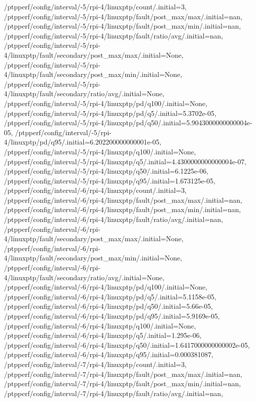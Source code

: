 {    /ptpperf/config/interval/-5/rpi-4/linuxptp/count/.initial=3,
    /ptpperf/config/interval/-5/rpi-4/linuxptp/fault/post_max/max/.initial=nan,
    /ptpperf/config/interval/-5/rpi-4/linuxptp/fault/post_max/min/.initial=nan,
    /ptpperf/config/interval/-5/rpi-4/linuxptp/fault/ratio/avg/.initial=nan,
    /ptpperf/config/interval/-5/rpi-4/linuxptp/fault/secondary/post_max/max/.initial=None,
    /ptpperf/config/interval/-5/rpi-4/linuxptp/fault/secondary/post_max/min/.initial=None,
    /ptpperf/config/interval/-5/rpi-4/linuxptp/fault/secondary/ratio/avg/.initial=None,
    /ptpperf/config/interval/-5/rpi-4/linuxptp/pd/q100/.initial=None,
    /ptpperf/config/interval/-5/rpi-4/linuxptp/pd/q5/.initial=5.3702e-05,
    /ptpperf/config/interval/-5/rpi-4/linuxptp/pd/q50/.initial=5.9043000000000004e-05,
    /ptpperf/config/interval/-5/rpi-4/linuxptp/pd/q95/.initial=6.202200000000001e-05,
    /ptpperf/config/interval/-5/rpi-4/linuxptp/q100/.initial=None,
    /ptpperf/config/interval/-5/rpi-4/linuxptp/q5/.initial=4.4300000000000004e-07,
    /ptpperf/config/interval/-5/rpi-4/linuxptp/q50/.initial=6.1225e-06,
    /ptpperf/config/interval/-5/rpi-4/linuxptp/q95/.initial=1.673125e-05,
    /ptpperf/config/interval/-6/rpi-4/linuxptp/count/.initial=3,
    /ptpperf/config/interval/-6/rpi-4/linuxptp/fault/post_max/max/.initial=nan,
    /ptpperf/config/interval/-6/rpi-4/linuxptp/fault/post_max/min/.initial=nan,
    /ptpperf/config/interval/-6/rpi-4/linuxptp/fault/ratio/avg/.initial=nan,
    /ptpperf/config/interval/-6/rpi-4/linuxptp/fault/secondary/post_max/max/.initial=None,
    /ptpperf/config/interval/-6/rpi-4/linuxptp/fault/secondary/post_max/min/.initial=None,
    /ptpperf/config/interval/-6/rpi-4/linuxptp/fault/secondary/ratio/avg/.initial=None,
    /ptpperf/config/interval/-6/rpi-4/linuxptp/pd/q100/.initial=None,
    /ptpperf/config/interval/-6/rpi-4/linuxptp/pd/q5/.initial=5.1158e-05,
    /ptpperf/config/interval/-6/rpi-4/linuxptp/pd/q50/.initial=5.66e-05,
    /ptpperf/config/interval/-6/rpi-4/linuxptp/pd/q95/.initial=5.9169e-05,
    /ptpperf/config/interval/-6/rpi-4/linuxptp/q100/.initial=None,
    /ptpperf/config/interval/-6/rpi-4/linuxptp/q5/.initial=1.295e-06,
    /ptpperf/config/interval/-6/rpi-4/linuxptp/q50/.initial=1.6417000000000002e-05,
    /ptpperf/config/interval/-6/rpi-4/linuxptp/q95/.initial=0.000381087,
    /ptpperf/config/interval/-7/rpi-4/linuxptp/count/.initial=3,
    /ptpperf/config/interval/-7/rpi-4/linuxptp/fault/post_max/max/.initial=nan,
    /ptpperf/config/interval/-7/rpi-4/linuxptp/fault/post_max/min/.initial=nan,
    /ptpperf/config/interval/-7/rpi-4/linuxptp/fault/ratio/avg/.initial=nan,
}
